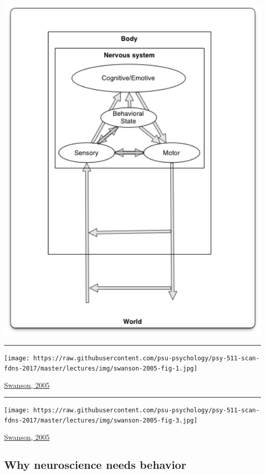 \documentclass[]{article}
\begin{document}
\includegraphics[width=5.62in]{img/swanson-fig-7.5}

\begin{center}\rule{0.5\linewidth}{\linethickness}\end{center}

\texttt{[image: https://raw.githubusercontent.com/psu-psychology/psy-511-scan-fdns-2017/master/lectures/img/swanson-2005-fig-1.jpg]}

\href{http://dx.doi.org/10.1002/cne.20733}{Swanson, 2005}

\begin{center}\rule{0.5\linewidth}{\linethickness}\end{center}

\texttt{[image: https://raw.githubusercontent.com/psu-psychology/psy-511-scan-fdns-2017/master/lectures/img/swanson-2005-fig-3.jpg]}

\href{http://dx.doi.org/10.1002/cne.20733}{Swanson, 2005}

\subsection{Why neuroscience needs
behavior}\label{why-neuroscience-needs-behavior}
\end{document}
